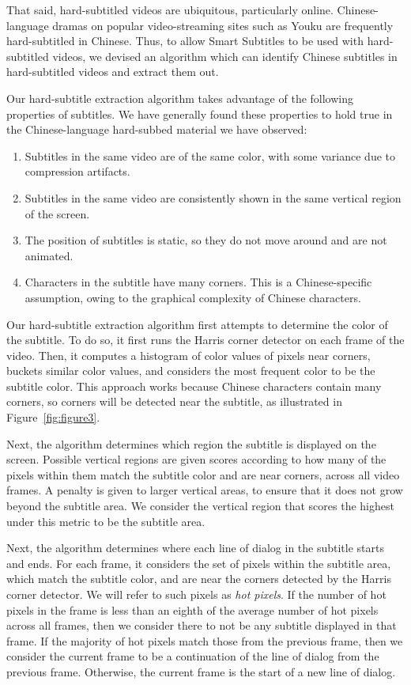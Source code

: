 \documentclass{sigchi}
\begin{document}
That said, hard-subtitled videos are ubiquitous, particularly online. Chinese-language dramas on popular video-streaming sites such as Youku are frequently hard-subtitled in Chinese. Thus, to allow Smart Subtitles to be used with hard-subtitled videos, we devised an algorithm which can identify Chinese subtitles in hard-subtitled videos and extract them out.

Our hard-subtitle extraction algorithm takes advantage of the following properties of subtitles. We have generally found these properties to hold true in the Chinese-language hard-subbed material we have observed:

\begin{enumerate}[noitemsep]
\item Subtitles in the same video are of the same color, with some variance due to compression artifacts.
\item Subtitles in the same video are consistently shown in the same vertical region of the screen.
\item The position of subtitles is static, so they do not move around and are not animated.
\item Characters in the subtitle have many corners. This is a Chinese-specific assumption, owing to the graphical complexity of Chinese characters.
\end{enumerate}

Our hard-subtitle extraction algorithm first attempts to determine the color
of the subtitle. To do so, it first runs the Harris corner detector \cite{harris1988combined}
on each frame of the video. Then, it computes a histogram of color values of pixels near corners, buckets similar color values, and considers the most frequent color to be the subtitle color. This approach works because Chinese characters contain many corners,
so corners will be detected near the subtitle, as illustrated
in Figure~\ref{fig:figure3}.

Next, the algorithm determines which region the subtitle is displayed on the screen. Possible vertical regions are given scores according to how many of the pixels within them match the subtitle color and are
near corners, across all video frames. A penalty is given to larger vertical
areas, to ensure that it does not grow beyond the subtitle area. We consider the vertical region
that scores the highest under this metric to be the subtitle area.

Next, the algorithm determines where each line of dialog in the subtitle
starts and ends. For each frame, it considers the set of pixels within the subtitle area,
which match the subtitle color, and are near the corners detected by the Harris corner detector. We will refer to such pixels as \emph{hot pixels}. If the number of hot pixels in the frame is less than
an eighth of the average number of hot pixels across all frames,
then we consider there to not be any subtitle displayed in that frame.
If the majority of hot pixels match those from the previous frame, then
we consider the current frame to be a continuation of the line of dialog from the previous frame.
Otherwise, the current frame is the start of a new line of dialog.
\end{document}
